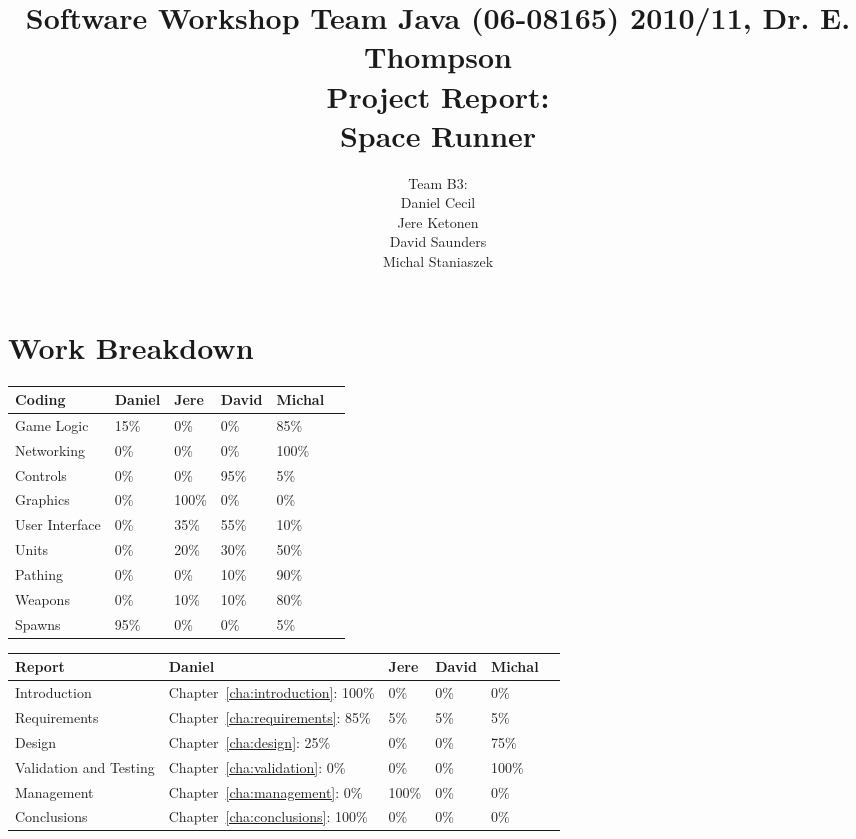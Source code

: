 \documentclass[10pt]{report}
\title{
{\normalsize Software Workshop Team Java (06-08165) 2010/11, Dr. E. Thompson}\\[2cm]
Project Report:\\
Space Runner
}
\author{Team B3:\\
Daniel Cecil\\
Jere Ketonen\\
David Saunders\\
Michal Staniaszek
}
\begin{document}
\maketitle
\tableofcontents
\chapter*{Work Breakdown}
\label{work-breakdown}

\thispagestyle{empty}

\begin{center}
  \begin{tabular}{|l||l|l|l|l|l|}\hline
    \textbf{Coding} & \textbf{Daniel} & \textbf{Jere} & \textbf{David}
    & \textbf{Michal} \\\hline\hline
    Game Logic &  15\% & 0\% & 0\% & 85\%\\\hline
    Networking &  0\% & 0\% & 0\% & 100\%\\\hline
    Controls &  0\% & 0\% & 95\% & 5\%\\\hline
    Graphics &  0\% & 100\% & 0\% & 0\%\\\hline
    User Interface &  0\% & 35\% & 55\% & 10\%\\\hline
    Units &  0\% & 20\% & 30\% & 50\%\\\hline
    Pathing &  0\% & 0\% & 10\% & 90\%\\\hline
    Weapons &  0\% & 10\% & 10\% & 80\%\\\hline
    Spawns &  95\% & 0\% & 0\% & 5\%\\\hline
  \end{tabular}\vspace*{1cm}

  \begin{tabular}{|l||l|l|l|l|l|}\hline
    \textbf{Report} & \textbf{Daniel} & \textbf{Jere} & \textbf{David}
    & \textbf{Michal}\\\hline\hline
    Introduction & Chapter~\ref{cha:introduction}: 100\% & 0\% & 0\% & 0\%\\\hline
    Requirements & Chapter~\ref{cha:requirements}: 85\% & 5\% & 5\% & 5\%\\\hline
    Design & Chapter~\ref{cha:design}: 25\% & 0\% & 0\% & 75\%\\\hline
    Validation and Testing & Chapter~\ref{cha:validation}: 0\% & 0\% & 0\% & 100\%\\\hline
    Management & Chapter~\ref{cha:management}: 0\% & 100\% & 0\% & 0\%\\\hline
    Conclusions & Chapter~\ref{cha:conclusions}: 100\% & 0\% & 0\% & 0\%\\\hline
  \end{tabular}
\end{center}
\end{document}
